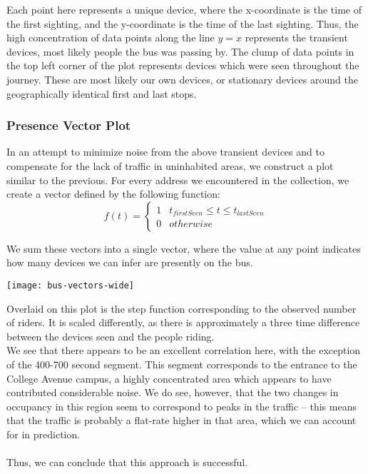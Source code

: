 \documentclass[12pt,journal,compsoc]{IEEEtran}
\begin{document}
		Each point here represents a unique device, where the x-coordinate is the time of the first sighting, and the y-coordinate is the time of the last sighting.
		Thus, the high concentration of data points along the line \(y=x\) represents the transient devices, most likely people the bus was passing by.
		The clump of data points in the top left corner of the plot represents devices which were seen throughout the journey.
		These are most likely our own devices, or stationary devices around the geographically identical first and last stops.

	\subsubsection*{Presence Vector Plot}
		In an attempt to minimize noise from the above transient devices and to compensate for the lack of traffic in uninhabited areas, we construct a plot similar to the previous. %
		For every address we encountered in the collection, we create a vector defined by the following function:
		\begin{equation*}
		f(t) = \begin{cases}
			1 & t_{firstSeen} \le t \le t_{lastSeen}\\
			0 & otherwise
		\end{cases}
		\end{equation*}

		We sum these vectors into a single vector, where the value at any point indicates how many devices we can infer are presently on the bus.

		\begin{figure*}[!t]
		\texttt{[image: bus-vectors-wide]}
		\end{figure*}

		Overlaid on this plot is the step function corresponding to the observed number of riders.
		It is scaled differently, as there is approximately a three time difference between the devices seen and the people riding.
		\\
		We see that there appears to be an excellent correlation here, with the exception of the 400-700 second segment. %
		This segment corresponds to the entrance to the College Avenue campus, a highly concentrated area which appears to have contributed considerable noise.
		We do see, however, that the two changes in occupancy in this region seem to correspond to peaks in the traffic -- this means that the traffic is probably a flat-rate higher in that area, which we can account for in prediction.
		\\\\
		Thus, we can conclude that this approach is successful. %
\end{document}
